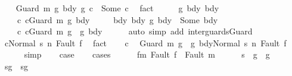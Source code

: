 \begin{isabellebody}
\ \ \isamarkupfalse%
\ {\isachardoublequoteopen}{\isacharparenleft}Guard\ m\ g{}\ bdy{}\ {\isasyminter}\isactrlsub g\ c{}{\isacharparenright}\ {\isacharequal}\ Some\ c{\isachardoublequoteclose}\ \isamarkupfalse%
\ fact\isanewline
\ \ \isamarkupfalse%
\ \isamarkupfalse%
\ g{}\ bdy{}\ bdy\ \isanewline
\ \ \ \ c{}{\isacharcolon}\ {\isachardoublequoteopen}c{}{\isacharequal}Guard\ m\ g{}\ bdy{}{\isachardoublequoteclose}\ \isanewline
\ \ \ \ bdy{\isacharcolon}\ {\isachardoublequoteopen}{\isacharparenleft}bdy{}\ {\isasyminter}\isactrlsub g\ bdy{}{\isacharparenright}\ {\isacharequal}\ Some\ bdy{\isachardoublequoteclose}\ \isanewline
\ \ \ \ c{\isacharcolon}\ {\isachardoublequoteopen}c{\isacharequal}Guard\ m\ {\isacharparenleft}g{}\ {\isasyminter}\ g{}{\isacharparenright}\ bdy{\isachardoublequoteclose}\isanewline
\ \ \ \ \isamarkupfalse%
\ {\isacharparenleft}auto\ simp\ add{\isacharcolon}\ inter{\isacharunderscore}guards{\isacharunderscore}Guard{\isacharparenright}\isanewline
\ \ \isamarkupfalse%
\ {\isachardoublequoteopen}{\isasymGamma}{\isasymturnstile}{\isasymlangle}c{\isacharcomma}Normal\ s{\isasymrangle}\ {\isacharequal}n{\isasymRightarrow}\ Fault\ f{\isachardoublequoteclose}\ \isamarkupfalse%
\ fact\isanewline
\ \ \isamarkupfalse%
\ c\ \isamarkupfalse%
\ {\isachardoublequoteopen}{\isasymGamma}{\isasymturnstile}{\isasymlangle}Guard\ m\ {\isacharparenleft}g{}\ {\isasyminter}\ g{}{\isacharparenright}\ bdy{\isacharcomma}Normal\ s{\isasymrangle}\ {\isacharequal}n{\isasymRightarrow}\ Fault\ f{\isachardoublequoteclose}\isanewline
\ \ \ \ \isamarkupfalse%
\ simp\isanewline
\ \ \isamarkupfalse%
\ {\isacharquery}case\isanewline
\ \ \isamarkupfalse%
\ {\isacharparenleft}cases{\isacharparenright}\isanewline
\ \ \ \ \isamarkupfalse%
\ f{\isacharunderscore}m{\isacharcolon}\ {\isachardoublequoteopen}Fault\ f\ {\isacharequal}\ Fault\ m{\isachardoublequoteclose}\isanewline
\ \ \ \ \isamarkupfalse%
\ {\isachardoublequoteopen}s\ {\isasymnotin}\ g{}\ {\isasyminter}\ g{}{\isachardoublequoteclose}\isanewline
\ \ \ \ \isamarkupfalse%
\ {\isachardoublequoteopen}s{\isasymnotin}g{}\ {\isasymor}\ s{\isasymnotin}g{}{\isachardoublequoteclose}\isanewline

\end{isabellebody}

